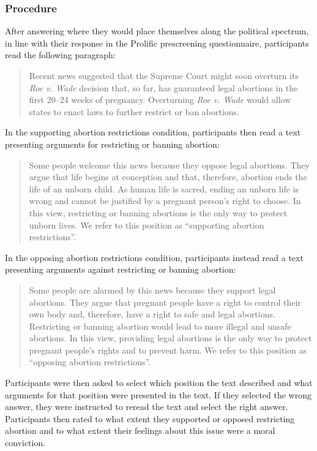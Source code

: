 \documentclass[12pt, letterpaper]{article}
\begin{document}
\hypertarget{procedure-2}{%
\subsubsection{Procedure}\label{procedure-2}}

After answering where they would place themselves along the political
spectrum, in line with their response in the Prolific prescreening
questionnaire, participants read the following paragraph:

\begin{quote}
Recent news suggested that the Supreme Court might soon overturn its
\emph{Roe v. Wade} decision that, so far, has guaranteed legal abortions
in the first 20--24 weeks of pregnancy. Overturning \emph{Roe v. Wade}
would allow states to enact laws to further restrict or ban abortions.
\end{quote}

\noindent In the supporting abortion restrictions condition,
participants then read a text presenting arguments for restricting or
banning abortion:

\begin{quote}
Some people welcome this news because they oppose legal abortions. They
argue that life begins at conception and that, therefore, abortion ends
the life of an unborn child. As human life is sacred, ending an unborn
life is wrong and cannot be justified by a pregnant person's right to
choose. In this view, restricting or banning abortions is the only way
to protect unborn lives. We refer to this position as ``supporting
abortion restrictions''.
\end{quote}

\noindent In the opposing abortion restrictions condition, participants
instead read a text presenting arguments against restricting or banning
abortion:

\begin{quote}
Some people are alarmed by this news because they support legal
abortions. They argue that pregnant people have a right to control their
own body and, therefore, have a right to safe and legal abortions.
Restricting or banning abortion would lead to more illegal and unsafe
abortions. In this view, providing legal abortions is the only way to
protect pregnant people's rights and to prevent harm. We refer to this
position as ``opposing abortion restrictions''.
\end{quote}

\noindent Participants were then asked to select which position the text
described and what arguments for that position were presented in the
text. If they selected the wrong answer, they were instructed to reread
the text and select the right answer. Participants then rated to what
extent they supported or opposed restricting abortion and to what extent
their feelings about this issue were a moral conviction.
\end{document}
